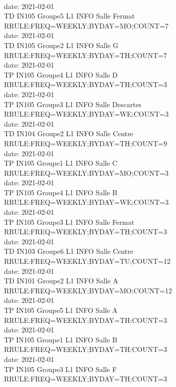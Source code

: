\documentclass{ltxdoc}
\begin{document}
\begin{center}
\\ date: 2021-02-01\\TD  IN105  Groupe5  L1 INFO  Salle Fermat\\RRULE:FREQ=WEEKLY;BYDAY=MO;COUNT=7
\\ date: 2021-02-01\\TD  IN105  Groupe2  L1 INFO  Salle G\\RRULE:FREQ=WEEKLY;BYDAY=TH;COUNT=7
\\ date: 2021-02-01\\TP  IN105  Groupe4  L1 INFO  Salle D\\RRULE:FREQ=WEEKLY;BYDAY=TH;COUNT=3
\\ date: 2021-02-01\\TP  IN105  Groupe3  L1 INFO  Salle Descartes\\RRULE:FREQ=WEEKLY;BYDAY=WE;COUNT=3
\\ date: 2021-02-01\\TD  IN104  Groupe2  L1 INFO  Salle Centre\\RRULE:FREQ=WEEKLY;BYDAY=TH;COUNT=9
\\ date: 2021-02-01\\TP  IN105  Groupe1  L1 INFO  Salle C\\RRULE:FREQ=WEEKLY;BYDAY=MO;COUNT=3
\\ date: 2021-02-01\\TP  IN105  Groupe4  L1 INFO  Salle B\\RRULE:FREQ=WEEKLY;BYDAY=WE;COUNT=3
\\ date: 2021-02-01\\TP  IN105  Groupe3  L1 INFO  Salle Fermat\\RRULE:FREQ=WEEKLY;BYDAY=TH;COUNT=3
\\ date: 2021-02-01\\TD  IN103  Groupe6  L1 INFO  Salle Centre\\RRULE:FREQ=WEEKLY;BYDAY=TU;COUNT=12
\\ date: 2021-02-01\\TD  IN101  Groupe2  L1 INFO  Salle A\\RRULE:FREQ=WEEKLY;BYDAY=MO;COUNT=12
\\ date: 2021-02-01\\TP  IN105  Groupe5  L1 INFO  Salle A\\RRULE:FREQ=WEEKLY;BYDAY=TH;COUNT=3
\\ date: 2021-02-01\\TP  IN105  Groupe1  L1 INFO  Salle B\\RRULE:FREQ=WEEKLY;BYDAY=TH;COUNT=3
\\ date: 2021-02-01\\TP  IN105  Groupe3  L1 INFO  Salle F\\RRULE:FREQ=WEEKLY;BYDAY=TH;COUNT=3

\end{center}
\end{document}
